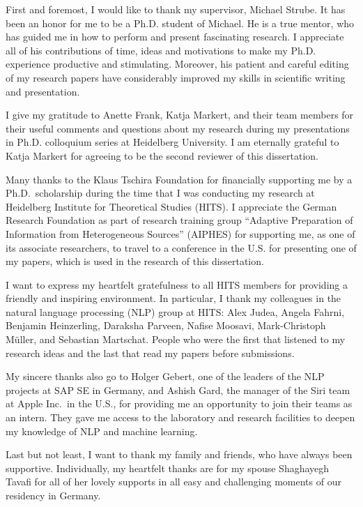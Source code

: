 
First and foremost, I would like to thank my supervisor, Michael Strube. 
It has been an honor for me to be a Ph.D. student of Michael. 
He is a true mentor, who has guided me in how to perform and present fascinating research. 
I appreciate all of his contributions of time, ideas and motivations to make my Ph.D. experience productive and stimulating. 
Moreover, his patient and careful editing of my research papers have considerably improved my skills in scientific writing and presentation. 

I give my gratitude to Anette Frank, Katja Markert, and their team members for their useful comments and questions about my research during my presentations in Ph.D. colloquium series at Heidelberg University.  
I am eternally grateful to Katja Markert for agreeing to be the second reviewer of this dissertation. 

Many thanks to the Klaus Tschira Foundation for financially supporting me by a Ph.D.\ scholarship during the time that I was conducting my research at Heidelberg Institute for Theoretical Studies (HITS). 
I appreciate the German Research Foundation as part of research training group “Adaptive Preparation of Information from Heterogeneous Sources” (AIPHES) for supporting me, as one of its associate researchers, to travel to a conference in the U.S. for presenting one of my papers, which is used in the research of this dissertation.   

I want to express my heartfelt gratefulness to all HITS members for providing a friendly and inspiring environment. 
In particular, I thank my colleagues in the natural language processing (NLP) group at HITS:
Alex Judea, Angela Fahrni, Benjamin Heinzerling, Daraksha Parveen, Nafise Moosavi, \mbox{Mark-Christoph} M{\"u}ller, and Sebastian Martschat.  
People who were the first that listened to my research ideas and the last that read my papers before submissions. 

My sincere thanks also go to Holger Gebert, one of the leaders of the NLP projects at SAP SE in Germany, and Ashish Gard, the manager of the Siri team at Apple Inc.\ in the U.S., for providing me an opportunity to join their teams as an intern. 
They gave me access to the laboratory and research facilities to deepen my knowledge of NLP and machine learning. 

Last but not least, I want to thank my family and friends, who have always been supportive. 
Individually, my heartfelt thanks are for my spouse Shaghayegh Tavafi for all of her lovely supports in all easy and challenging moments of our residency in Germany. 